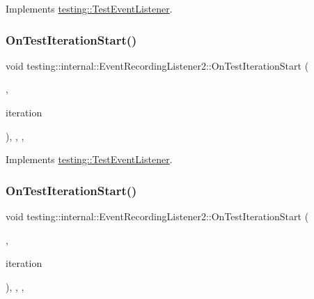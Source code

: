 Implements \mbox{\hyperlink{classtesting_1_1_test_event_listener_a550fdb3e55726e4cefa09f5697941425}{testing\+::\+Test\+Event\+Listener}}.

\mbox{\label{classtesting_1_1internal_1_1_event_recording_listener2_ab208d8583e6593b4c7d89db6f8f2600b}} 
\subsubsection{\texorpdfstring{OnTestIterationStart()}{OnTestIterationStart()}\hspace{0.1cm}{\footnotesize\ttfamily [1/2]}}
{\footnotesize\ttfamily void testing\+::internal\+::\+Event\+Recording\+Listener2\+::\+On\+Test\+Iteration\+Start (\begin{DoxyParamCaption}\item[{const \mbox{\hyperlink{classtesting_1_1_unit_test}{Unit\+Test}} \&}]{,  }\item[{int}]{iteration }\end{DoxyParamCaption})\hspace{0.3cm}{\ttfamily [inline]}, {\ttfamily [override]}, {\ttfamily [protected]}, {\ttfamily [virtual]}}



Implements \mbox{\hyperlink{classtesting_1_1_test_event_listener_a60cc09b7907cb329d152eb5e7133bdeb}{testing\+::\+Test\+Event\+Listener}}.

\mbox{\label{classtesting_1_1internal_1_1_event_recording_listener2_ab208d8583e6593b4c7d89db6f8f2600b}} 
\subsubsection{\texorpdfstring{OnTestIterationStart()}{OnTestIterationStart()}\hspace{0.1cm}{\footnotesize\ttfamily [2/2]}}
{\footnotesize\ttfamily void testing\+::internal\+::\+Event\+Recording\+Listener2\+::\+On\+Test\+Iteration\+Start (\begin{DoxyParamCaption}\item[{const \mbox{\hyperlink{classtesting_1_1_unit_test}{Unit\+Test}} \&}]{,  }\item[{int}]{iteration }\end{DoxyParamCaption})\hspace{0.3cm}{\ttfamily [inline]}, {\ttfamily [override]}, {\ttfamily [protected]}, {\ttfamily [virtual]}}



